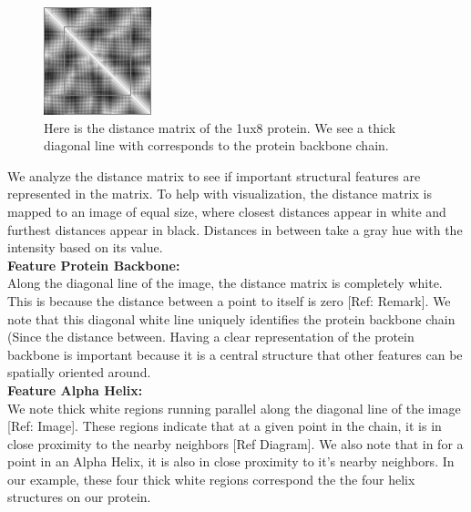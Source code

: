 \documentclass[12pt, a4paper, twocolumn, fullpage]{article}
\theoremstyle{plain}
\theoremstyle{definition}
\theoremstyle{remark}
\begin{document}
\begin{figure}[h]
    \centering
    \includegraphics[width=.7\linewidth]{1ux8matBase}
    \caption{Here is the distance matrix of the 1ux8 protein. We see a thick diagonal line with corresponds to the protein backbone chain.}
    \label{1ux8matBase}
\end{figure}
    
We analyze the distance matrix to see if important structural features are represented in the matrix. To help with visualization, the distance matrix is mapped to an image of equal size, where closest distances appear in white and furthest distances appear in black. Distances in between take a gray hue with the intensity based on its value.
\\

\noindent
\textbf{Feature Protein Backbone:}\\
Along the diagonal line of the image, the distance matrix is completely white. This is because the distance between a point to itself is zero [Ref: Remark]. We note that this diagonal white line uniquely identifies the protein backbone chain (Since the distance between. Having a clear representation of the protein backbone is important because  it is a central structure that other features can be spatially oriented around.
\\

\noindent
\textbf{Feature Alpha Helix:}\\
We note thick white regions running parallel along the diagonal line of the image [Ref: Image]. These regions indicate that at a given point in the chain, it is in close proximity to the nearby neighbors [Ref Diagram]. We also note that in for a point in an Alpha Helix, it is also in close proximity to it's nearby neighbors. In our example, these four thick white regions correspond the the four helix structures on our protein.
    
\end{document}
